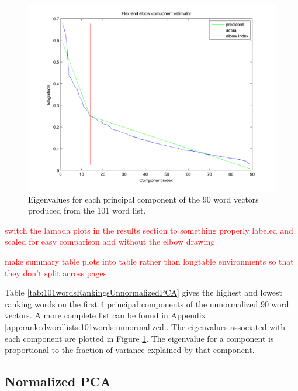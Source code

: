 \documentclass[10pt,letterpaper]{book}
\newcommand{\todo}[1]{\textcolor{red}{#1}}
\begin{document}


\begin{figure}[!htbp]
    \includegraphics[width=0.9\linewidth]{100words-adj-800dim-lowercase_wmt_model-original-flex_end_elbow}
    \caption{Eigenvalues for each principal component of the 90 word vectors
    produced from the 101 word list.}
    \label{fig:101wordsunnormalizedpcaeigenvalues}
\end{figure}

\todo{switch the lambda plots in the results section to something properly labeled and scaled for easy comparison and without the elbow drawing}

\todo{make summary table plots into table rather than longtable environments so that they don't split across pages}

Table \ref{tab:101wordsRankingsUnnormalizedPCA} gives the highest and lowest
ranking words on the first 4 principal components of the unnormalized 90 word 
vectors. A more complete list can be found in Appendix 
\ref{app:rankedwordlists:101words:unnormalized}. The eigenvalues associated 
with each component are plotted in Figure 
\ref{fig:101wordsunnormalizedpcaeigenvalues}. The eigenvalue for a component is
proportional to the fraction of variance explained by that component.


\subsection{Normalized PCA}


\end{document}
